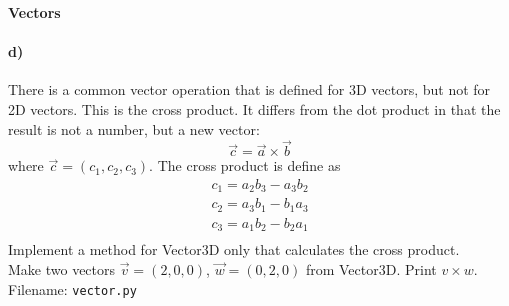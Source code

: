 \begin{Problem}{\textbf{Vectors}}
\paragraph{d)}
There is a common vector operation that is defined for 3D vectors, but not for 2D vectors. This is the cross product. It differs from the dot product in that the result is not a number, but a new vector:
\begin{equation*}
    \Vec{c} = \Vec{a} \times \Vec{b}
\end{equation*}
where $\Vec{c} = (c_1, c_2, c_3)$. The cross product is define as
\begin{align*}
    c_1 = a_2 b_3 - a_3 b_2\\
    c_2 = a_3 b_1 - b_1 a_3\\
    c_3 = a_1 b_2 - b_2 a_1\\
\end{align*}
Implement a method  for Vector3D only that calculates the cross product. \\
Make two vectors $\Vec{v}=(2,0,0)$, $\Vec{w}=(0,2,0)$ from Vector3D. Print $v\times w$.
\\
Filename: \texttt{vector.py}
\end{Problem}

